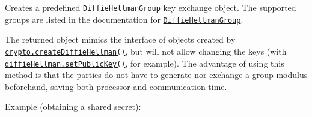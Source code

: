 Creates a predefined \texttt{DiffieHellmanGroup} key exchange object.
The supported groups are listed in the documentation for
\hyperref[class-diffiehellmangroup]{\texttt{DiffieHellmanGroup}}.

The returned object mimics the interface of objects created by
\hyperref[cryptocreatediffiehellmanprime-primeencoding-generator-generatorencoding]{\texttt{crypto.createDiffieHellman()}},
but will not allow changing the keys (with
\hyperref[diffiehellmansetpublickeypublickey-encoding]{\texttt{diffieHellman.setPublicKey()}},
for example). The advantage of using this method is that the parties do
not have to generate nor exchange a group modulus beforehand, saving
both processor and communication time.

Example (obtaining a shared secret):

\begin{Shaded}
\begin{Highlighting}[]
\NormalTok{ \{}
\OperatorTok{,}
\NormalTok{\} }\OperatorTok{=}  \NormalTok{(}\NormalTok{)}\OperatorTok{;}
\OperatorTok{=} \NormalTok{(}\NormalTok{)}\OperatorTok{;}
\OperatorTok{=} \NormalTok{(}\NormalTok{)}\OperatorTok{;}

\NormalTok{()}\OperatorTok{;}
\NormalTok{()}\OperatorTok{;}

\OperatorTok{=}\NormalTok{()}\OperatorTok{,} \OperatorTok{,} \NormalTok{)}\OperatorTok{;}
\OperatorTok{=}\NormalTok{()}\OperatorTok{,} \OperatorTok{,} \NormalTok{)}\OperatorTok{;}

\OperatorTok{===}\OperatorTok{;}
\end{Highlighting}
\end{Shaded}

